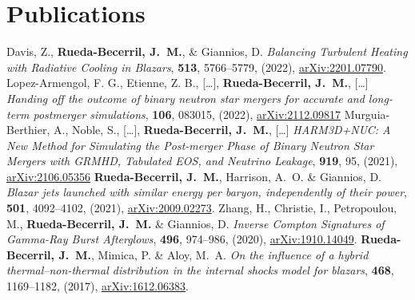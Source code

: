 \section{Publications}

\renewcommand{\refname}{Articles}
\setcounter{num}{0}
\renewcommand{\MyNbOfPub}{8}%
\renewcommand*{\bibliographyitemlabel}{[\arabic{enumiv}]}
\begin{thebibliography}{99}
   Davis, Z., \textbf{Rueda-Becerril, J.~M.}, \& Giannios, D. \textit{Balancing Turbulent Heating with Radiative Cooling in Blazars}, \href{https://doi.org/10.1093/mnras/stac1282}{\mnras} \textbf{513}, 5766--5779, (2022), \href{https://arxiv.org/abs/2201.07790}{arXiv:2201.07790}.
   Lopez-Armengol, F. G., Etienne, Z. B., [\ldots], \textbf{Rueda-Becerril, J.~M.}, [\ldots] \textit{Handing off the outcome of binary neutron star mergers for accurate and long-term postmerger simulations}, \href{https://doi.org/10.1103/PhysRevD.106.083015}{\prd} \textbf{106}, 083015, (2022), \href{https://arxiv.org/abs/2112.09817}{arXiv:2112.09817}
   Murguia-Berthier, A., Noble, S., [\ldots], \textbf{Rueda-Becerril, J.~M.}, [\ldots] \textit{HARM3D+NUC: A New Method for Simulating the Post-merger Phase of Binary Neutron Star Mergers with GRMHD, Tabulated EOS, and Neutrino Leakage}, \href{https://doi.org/10.3847/1538-4357/ac1119}{\apj} \textbf{919}, 95, (2021), \href{https://arxiv.org/abs/2106.05356}{arXiv:2106.05356}
   \textbf{Rueda-Becerril, J.~M.}, Harrison, A.~O. \& Giannios, D. \textit{Blazar jets launched with similar energy per baryon, independently of their power}, \href{https://doi.org/10.1093/mnras/staa3925}{\mnras} \textbf{501}, 4092--4102, (2021), \href{https://arxiv.org/abs/2009.02273}{arXiv:2009.02273}.
   Zhang, H., Christie, I., Petropoulou, M., \textbf{Rueda-Becerril, J.~M.} \& Giannios, D. \textit{Inverse Compton Signatures of Gamma-Ray Burst Afterglows}, \href{https://doi.org/10.1093/mnras/staa1583}{\mnras} \textbf{496}, 974--986, (2020), \href{https://arxiv.org/abs/1910.14049}{arXiv:1910.14049}.
   \textbf{Rueda-Becerril, J.~M.}, Mimica, P. \& Aloy, M.~A. \textit{On the influence of a hybrid thermal--non-thermal distribution in the internal shocks model for blazars}, \href{https://doi.org/10.1093/mnras/stx476}{\mnras} \textbf{468}, 1169--1182, (2017), \href{https://arxiv.org/abs/1612.06383}{arXiv:1612.06383}.

\end{thebibliography}
